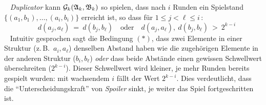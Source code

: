 \documentclass[fontsize=11pt, twoside=false, numbers=autoenddot]{scrbook}
\begin{document}
~
\emph{Duplicator} kann $\mathcal{G}_k(\mathfrak{A}_k,\mathfrak{B}_k)$ so spielen, dass nach $i$ Runden ein Spielstand
$\{ (a_1,b_1),\dots,(a_i,b_i) \}$ erreicht ist, so dass f\"ur $1 \leq j < \ell \leq i$\,:
%
\[
  \tag{$*$}
  \quad d(a_j,a_\ell) ~=~ d(b_j,b_\ell)
  \quad\text{oder}\quad
  d(a_j,a_\ell),~d(b_j,b_\ell) ~>~ 2^{k-i}
\]
%
~
Intuitiv gesprochen sagt die Bedingung $(*)$,
dass zwei Elemente in einer Struktur (z.\,B.\ $a_i,a_\ell$)
denselben Abstand haben wie die zugehörigen Elemente in der anderen Struktur ($b_i,b_\ell$)
\emph{oder} dass beide Abstände einen gewissen Schwellwert überschreiten ($2^{k-i}$).
Dieser Schwellwert wird kleiner, je mehr Runden bereits gespielt wurden:
mit wachsendem $i$ fällt der Wert $2^{k-i}$.
Dies verdeutlicht, dass die "`Unterscheidungskraft"' von \emph{Spoiler} sinkt,
je weiter das Spiel fortgeschritten ist.
\end{document}

